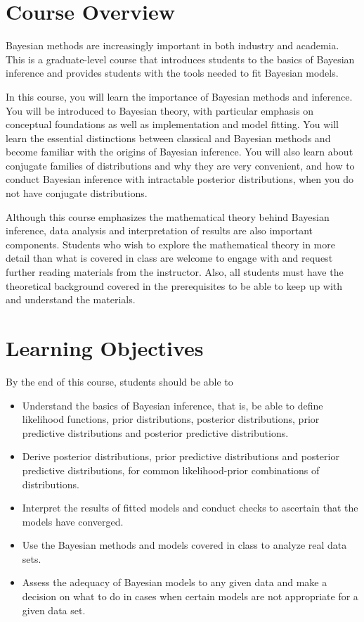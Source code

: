 \documentclass[11pt, a4paper]{article}
\begin{document}
\section{Course Overview}
Bayesian methods are increasingly important in both industry and academia. This is a graduate-level course that introduces students to the basics of Bayesian inference and provides students with the tools needed to fit Bayesian models.

In this course, you will learn the importance of Bayesian methods and inference. You will be introduced to Bayesian theory, with particular emphasis on conceptual foundations as well as implementation and model fitting. You will learn the essential distinctions between classical and Bayesian methods and become familiar with the origins of Bayesian inference. You will also learn about conjugate families of distributions and why they are very convenient, and how to conduct Bayesian inference with intractable posterior distributions,  when you do not have conjugate distributions.

Although this course emphasizes the mathematical theory behind Bayesian inference, data analysis and interpretation of results are also important components. Students who wish to explore the mathematical theory in more detail than what is covered in class are welcome to engage with and request further reading materials from the instructor. Also, all students must have the theoretical background covered in the prerequisites to be able to keep up with and understand the materials. 


\section{Learning Objectives}
By the end of this course, students should be able to
\begin{itemize}[label= {\color{darkblue}{\ArrowBoldRightStrobe}}]
	\item Understand the basics of Bayesian inference, that is, be able to define likelihood functions, prior distributions, posterior distributions, prior predictive distributions and posterior predictive distributions.
	\item Derive posterior distributions, prior predictive distributions and posterior predictive distributions, for common likelihood-prior combinations of distributions.
	\item Interpret the results of fitted models and conduct checks to ascertain that the models have converged.
	\item Use the Bayesian methods and models covered in class to analyze real data sets.
	\item Assess the adequacy of Bayesian models to any given data and make a decision on what to do in cases when certain models are not appropriate for a given data set.
\end{itemize}
\end{document}
